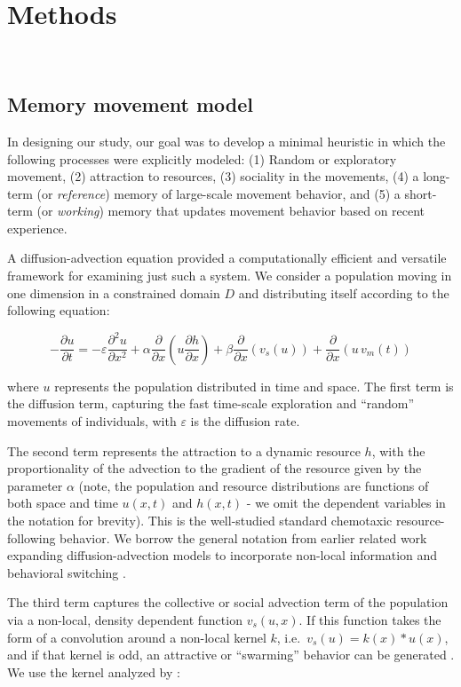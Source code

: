 \documentclass[utf8]{frontiersSCNS} %
\begin{document}
\section{Methods}
~
\subsection{Memory movement model}

	In designing our study, our goal was to develop a minimal heuristic in which the following processes were explicitly modeled: (1) Random or exploratory movement, (2) attraction to resources, (3) sociality in the movements, (4) a long-term (or \emph{reference}) memory of large-scale movement behavior, and (5) a short-term (or \emph{working}) memory that updates movement behavior based on recent experience.  
	
	A diffusion-advection equation provided a computationally efficient and versatile framework for examining just such a system. We consider a population moving in one dimension in a constrained domain $D$ and distributing itself according to the following equation:
	
	\begin{equation}\label{eq_mainmodel}
		-{\frac{\partial u}{\partial t}} = -\varepsilon {\frac{\partial^2 u}{\partial x^2}} + 
		\alpha \frac{\partial}{\partial x}\left(u \frac{\partial h}{\partial x}\right) + 
		\beta \frac{\partial}{\partial x}\left(v_s(u)\right) + \frac{\partial}{\partial x}\left(u\,v_m(t)\right)
	\end{equation}
	
	\noindent where $u$ represents the population distributed in time and space. The first term is the diffusion term, capturing the fast time-scale exploration and ``random'' movements of individuals, with $\varepsilon$ is the diffusion rate.
	
	The second term represents the attraction to a dynamic resource $h$, with the proportionality of the advection to the gradient of the resource given by the parameter $\alpha$ (note, the population and resource distributions are functions of both space and time $u(x,t)$ and $h(x,t)$ - we omit the dependent variables in the notation for brevity). This is the well-studied standard chemotaxic resource-following behavior. We borrow the general notation from earlier related work expanding diffusion-advection models to incorporate non-local information \citep{Fagan2017} and behavioral switching \citep{Fagan2019}.
	
	The third term captures the collective or social advection term of the population via a non-local, density dependent function $v_s(u,x)$. If this function takes the form of a convolution around a non-local kernel $k$, i.e.~$v_s(u) = k(x) * u(x)$, and if that kernel is odd, an attractive or ``swarming'' behavior can be generated \citep{Mogilner1999}. We use the kernel analyzed by \citet{Mogilner1999}: 
	
\end{document}
